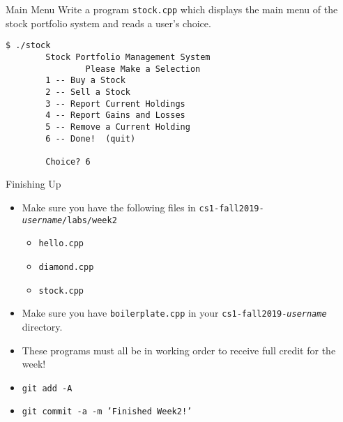 \documentclass{beamer}
\begin{document}
\begin{frame}[fragile]{Main Menu}
Write a program \texttt{stock.cpp} which displays the main menu of the
stock portfolio system and reads a user's choice.  
\begin{verbatim}
$ ./stock
        Stock Portfolio Management System
                Please Make a Selection
        1 -- Buy a Stock
        2 -- Sell a Stock
        3 -- Report Current Holdings
        4 -- Report Gains and Losses
        5 -- Remove a Current Holding
        6 -- Done!  (quit) 

        Choice? 6
\end{verbatim}

\end{frame}

\begin{frame}{Finishing Up}
\begin{itemize}
    \item Make sure you have the following files in
        \texttt{cs1-fall2019-{\em username}/labs/week2}
        \begin{itemize}
            \item \texttt{hello.cpp}
            \item \texttt{diamond.cpp}
            \item \texttt{stock.cpp}
        \end{itemize}
    \item Make sure you have \texttt{boilerplate.cpp} in your
        \texttt{cs1-fall2019-{\em username}} directory.
    \item These programs must all be in working order to receive full
        credit for the week!
    \item \texttt{git add -A}
    \item \texttt{git commit -a -m 'Finished Week2!'}
\end{itemize}
\end{frame}
\end{document}

